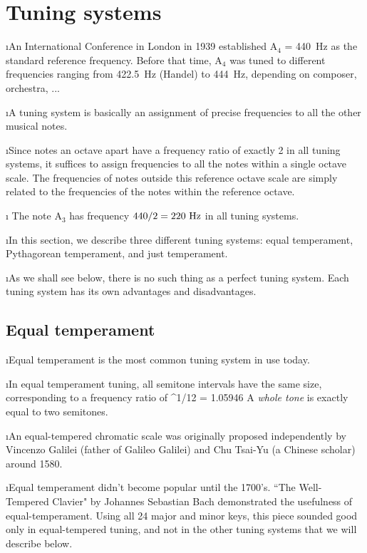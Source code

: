 \section{Tuning systems}

\bi

\i An International Conference in London
in 1939 established
A$_4$ = 440~Hz as the standard reference frequency.
Before that time, A$_4$ was tuned to different
frequencies ranging from 422.5~Hz (Handel) to
444~Hz, depending on composer, orchestra, ...

\i A tuning system is basically an assignment
of precise frequencies to all the other 
musical notes.

\i Since notes an octave apart have a frequency
ratio of exactly 2 in all tuning systems,
it suffices to assign frequencies to all the
notes within a single octave scale.  
The frequencies of notes outside this reference 
octave scale are simply related to the 
frequencies of the notes within the reference octave.

\i \ex
The note A$_3$ has frequency $440/2 =220~{\rm Hz}$
in all tuning systems.
 
\i In this section, we describe three different
tuning systems:
equal temperament, Pythagorean temperament, 
and just temperament.

\i As we shall see below, there is no such thing
as a perfect tuning system.
Each tuning system has its own advantages and 
disadvantages.

\ei
\subsection{Equal temperament}
\bi

\i Equal temperament is the most common 
tuning system in use today.

\i In equal temperament tuning, 
all semitone intervals have the same size, 
corresponding to a frequency ratio of 
%
^{1/12} = 1.05946
\ee
%
A {\em whole tone} is exactly equal to two semitones.

\i An equal-tempered chromatic scale was 
originally proposed independently 
by Vincenzo Galilei  (father of Galileo Galilei)
and Chu Tsai-Yu (a Chinese scholar) around 1580.

\i Equal temperament didn't become popular 
until the 1700's.
``The Well-Tempered Clavier" by Johannes Sebastian Bach 
demonstrated the usefulness of equal-temperament.
Using all 24 major and minor keys, this piece sounded
good only in equal-tempered tuning, and not in the other
tuning systems that we will describe below.

